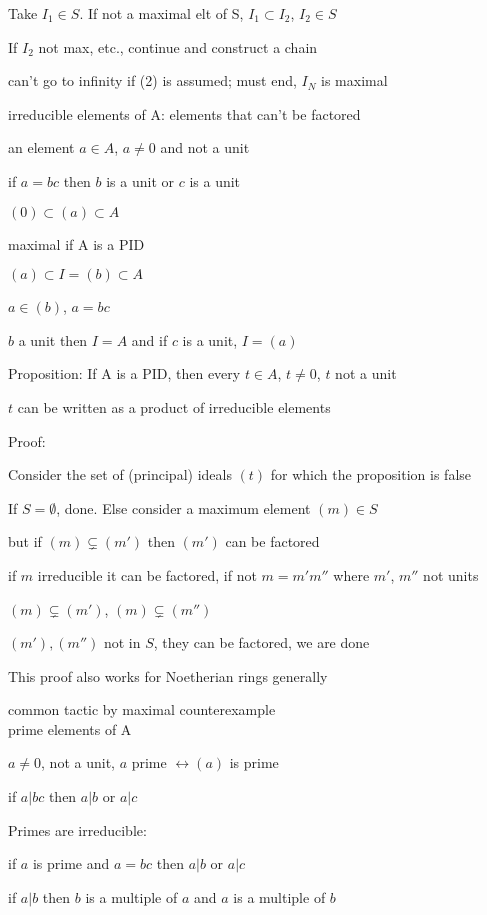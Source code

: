 \documentclass[12pt]{article}
\begin{document}
Take $I_1 \in S$.  If not a maximal elt of S, $I_1 \subset I_2$, $I_2 \in S$

If $I_2$ not max, etc., continue and construct a chain

can't go to infinity if (2) is assumed; must end, $I_N$ is maximal

\noindent
irreducible elements of A: elements that can't be factored

an element $a \in A$, $a \neq 0$ and not a unit

if $a = bc$ then $b$ is a unit or $c$ is a unit

\noindent
$(0) \subset (a) \subset A$

maximal if A is a PID

$(a) \subset I = (b) \subset A$

$a \in (b)$, $a = bc$

$b$ a unit then $I = A$ and if $c$ is a unit, $I = (a)$

\noindent
Proposition: If A is a PID, then every $t \in A$, $t \neq 0$, $t$ not a unit

$t$ can be written as a product of irreducible elements

\noindent
Proof:

Consider the set of (principal) ideals $(t)$ for which the proposition is false

If $S = \emptyset$, done.  Else consider a maximum element $(m) \in S$

but if $(m) \subsetneq (m')$ then $(m')$ can be factored

if $m$ irreducible it can be factored, if not $m = m'm''$ where $m'$, $m''$ not units

$(m) \subsetneq (m')$, $(m) \subsetneq (m'')$

$(m'), (m'')$ not in $S$, they can be factored, we are done

\noindent
This proof also works for Noetherian rings generally

\noindent
common tactic by maximal counterexample\\

\noindent
prime elements of A

$a \neq 0$, not a unit, $a$ prime $\leftrightarrow (a)$ is prime

if $a | bc$ then $a | b$ or $a | c$

\noindent
Primes are irreducible:

if $a$ is prime and $a = bc$ then $a|b$ or $a|c$

if $a|b$ then $b$ is a multiple of $a$ and $a$ is a multiple of $b$
\end{document}
